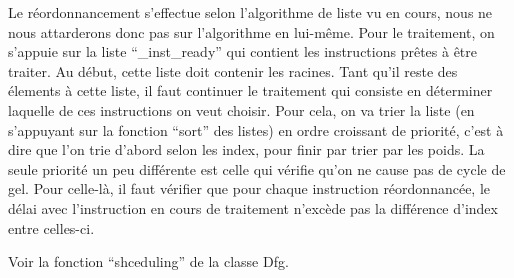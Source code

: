 \documentclass[a4paper, 11pt]{article}
\begin{document}
Le réordonnancement s'effectue selon l'algorithme de liste vu en cours, nous ne nous attarderons donc pas sur l'algorithme en lui-même. Pour le traitement, on s'appuie sur la liste ``\_inst\_ready'' qui contient les instructions prêtes à être traiter. Au début, cette liste doit contenir les racines. Tant qu'il reste des élements à cette liste, il faut continuer le traitement qui consiste en déterminer laquelle de ces instructions on veut choisir. Pour cela, on va trier la liste (en s'appuyant sur la fonction ``sort'' des listes) en ordre croissant de priorité, c'est à dire que l'on trie d'abord selon les index, pour finir par trier par les poids. La seule priorité un peu différente est celle qui vérifie qu'on ne cause pas de cycle de gel. Pour celle-là, il faut vérifier que pour chaque instruction réordonnancée, le délai avec l'instruction en cours de traitement n'excède pas la différence d'index entre celles-ci.

Voir la fonction ``shceduling'' de la classe Dfg.
\end{document}
